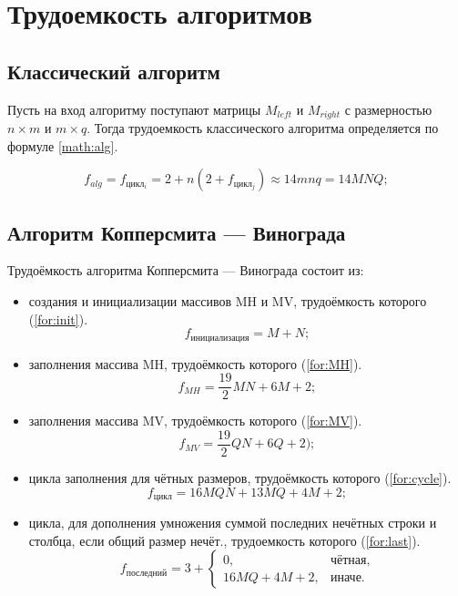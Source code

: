 \section{Трудоемкость алгоритмов}

\subsection{Классический алгоритм}

Пусть на вход алгоритму поступают матрицы $M_{left}$ и $M_{right}$ с размерностью $n \times m$ и $m \times q$. Тогда трудоемкость классического алгоритма определяется по формуле \ref{math:alg}.

\begin{equation}\label{math:alg}
	f_{alg} = f_{{цикл_i}} = 2 + n\left(2 + f_{цикл_j}\right) \approx 14mnq = 14MNQ;
\end{equation}
\subsection{Алгоритм Копперсмита — Винограда}

Трудоёмкость алгоритма Копперсмита — Винограда состоит из:
\begin{itemize}
	\item создания и инициализации массивов MH и MV, трудоёмкость которого (\ref{for:init}).
	\begin{equation}
		\label{for:init}
		f_{инициализация} = M + N;
	\end{equation}
	
	\item заполнения массива MH, трудоёмкость которого (\ref{for:MH}).
	\begin{equation}
		\label{for:MH}
		f_{MH} = \frac{19}{2}MN +6M +2;
	\end{equation}
	
	\item заполнения массива MV, трудоёмкость которого (\ref{for:MV}).
	\begin{equation}
		\label{for:MV}
		f_{MV} = \frac{19}{2}QN +6Q +2);
	\end{equation}
	
	\item цикла заполнения для чётных размеров, трудоёмкость которого (\ref{for:cycle}).
	\begin{equation}
		\label{for:cycle}
		f_{\text{цикл}} = 16MQN + 13MQ + 4M + 2;
	\end{equation}
	
	\item цикла, для дополнения умножения суммой последних нечётных строки и столбца, если общий размер нечёт., трудоемкость которого (\ref{for:last}).
	\begin{equation}
		\label{for:last}
		f_{\text{последний}} = 3 + \begin{cases}
			0, & \text{чётная,}\\
			16MQ + 4M + 2, & \text{иначе.}
		\end{cases}
	\end{equation}
\end{itemize}


